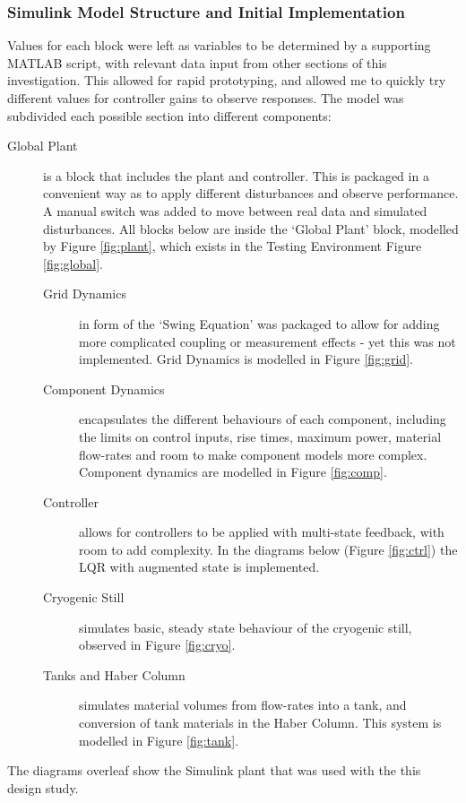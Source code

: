 \subsubsection{Simulink Model Structure and Initial Implementation}

Values for each block were left as variables to be determined by a supporting MATLAB script, with relevant data input from other sections of this investigation.
This allowed for rapid prototyping, and allowed me to quickly try different values for controller gains to observe responses.
The model was subdivided each possible section into different components:
\begin{description}
\item[Global Plant]{ is a block that includes the plant and controller.
This is packaged in a convenient way as to apply different disturbances and observe performance.
A manual switch was added to move between real data and simulated disturbances.
All blocks below are inside the `Global Plant' block, modelled by Figure \ref{fig:plant}, which exists in the Testing Environment Figure \ref{fig:global}.}
\begin{description}
        \item[Grid Dynamics]{ in form of the `Swing Equation' was packaged to allow for adding more complicated coupling or measurement effects - yet this was not implemented. Grid Dynamics is modelled in Figure \ref{fig:grid}.}
        \item[Component Dynamics]{ encapsulates the different behaviours of each component, including the limits on control inputs, rise times, maximum power, material flow-rates and room to make component models more complex. Component dynamics are modelled in Figure \ref{fig:comp}.}
        \item[Controller]{ allows for controllers to be applied with multi-state feedback, with room to add complexity. In the diagrams below (Figure \ref{fig:ctrl}) the LQR with augmented state is implemented.}
        \item[Cryogenic Still]{ simulates basic, steady state behaviour of the cryogenic still, observed in Figure \ref{fig:cryo}.}
        \item[Tanks and Haber Column]{ simulates material volumes from flow-rates into a tank, and conversion of tank materials in the Haber Column. This system is modelled in Figure \ref{fig:tank}.}
\end{description}
\end{description}
The diagrams overleaf show the Simulink plant that was used with the this design study.

